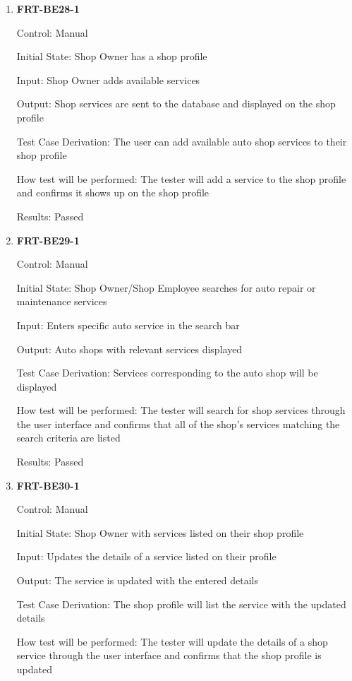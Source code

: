 \documentclass[12pt, titlepage]{article}
\begin{document}
\begin{enumerate}

	\item \textbf{FRT-BE28-1}

	      Control: Manual

	      Initial State: Shop Owner has a shop profile

	      Input: Shop Owner adds available services

	      Output: Shop services are sent to the database and displayed on the shop profile

	      Test Case Derivation: The user can add available auto shop services to their shop profile

	      How test will be performed: The tester will add a service to the shop profile and confirms it shows
	      up on the shop profile

	      Results: Passed

	\item \textbf{FRT-BE29-1}

	      Control: Manual

	      Initial State: Shop Owner/Shop Employee searches for auto repair or maintenance services

	      Input: Enters specific auto service in the search bar

	      Output: Auto shops with relevant services displayed

	      Test Case Derivation: Services corresponding to the auto shop will be displayed

	      How test will be performed: The tester will search for shop services through the user interface and
	      confirms that all of the shop's services matching the search criteria are listed

	      Results: Passed

	\item \textbf{FRT-BE30-1}

	      Control: Manual

	      Initial State: Shop Owner with services listed on their shop profile

	      Input: Updates the details of a service listed on their profile

	      Output: The service is updated with the entered details

	      Test Case Derivation: The shop profile will list the service with the updated details

	      How test will be performed: The tester will update the details of a shop service through the user
	      interface and confirms that the shop profile is updated


\end{enumerate}
\end{document}
